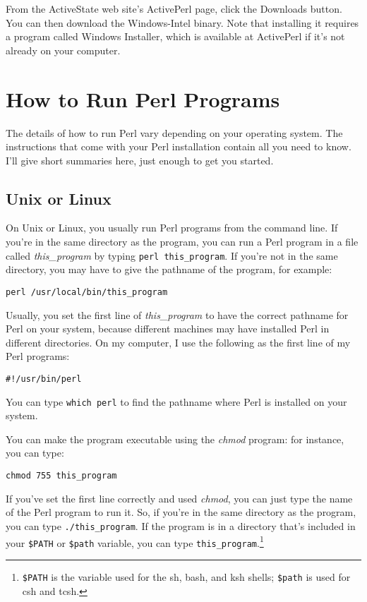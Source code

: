 From the ActiveState web site's ActivePerl page, click the Downloads button. You can then download the Windows-Intel binary. Note that installing it requires a program called Windows Installer, which is available at ActivePerl if it's not already on your computer. 

\section{How to Run Perl Programs}
The details of how to run Perl vary depending on your operating system. The instructions that come with your Perl installation contain all you need to know. I'll give short summaries here, just enough to get you started.

\subsection{Unix or Linux}
On Unix or Linux, you usually run Perl programs from the command line.  If you're in the same directory as the program, you can run a Perl program in a file called \textit{this\_program} by typing \verb|perl this_program|. If you're not in the same directory, you may have to give the pathname of the program, for example:

\verb|perl /usr/local/bin/this_program|

Usually, you set the first line of \textit{this\_program} to have the correct pathname for Perl on your system, because different machines may have installed Perl in different directories. On my computer, I use the following as the first line of my Perl programs:

\verb|#!/usr/bin/perl|

You can type \verb|which perl| to find the pathname where Perl is installed on your system.

You can make the program executable using the \textit{chmod} program: for instance, you can type:

\verb|chmod 755 this_program|

If you've set the first line correctly and used \textit{chmod}, you can just type the name of the Perl program to run it. So, if you're in the same directory as the program, you can type \verb|./this_program|. If the program is in a directory that's included in your \verb|$PATH| or \verb|$path| variable, you can type \verb|this_program|.\footnote{\verb|$PATH| is the variable used for the sh, bash, and ksh shells; \verb|$path| is used for csh and tcsh.}

